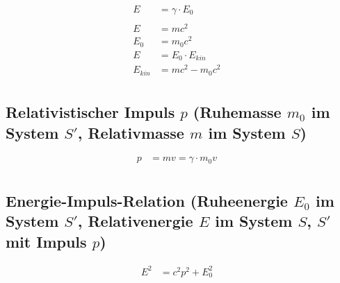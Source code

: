 \begin{align*}
  E &= \gamma \cdot E_0 &\\ &\\
  E &= m c^2 &\\
  E_0 &= m_0 c^2 &\\
  E &= E_0 \cdot E_{kin} &\\
  E_{kin} &= m c^2 - m_0 c^2 &\\
\end{align*}

\subsection{Relativistischer Impuls $p$ (Ruhemasse $m_0$ im System $S'$, Relativmasse $m$ im System
$S$)}

\begin{align*}
  p &= m v = \gamma \cdot m_0 v &\\
\end{align*}

\subsection{Energie-Impuls-Relation (Ruheenergie $E_0$ im System $S'$, Relativenergie $E$ im System
$S$, $S'$ mit Impuls $p$)}

\begin{align*}
  E^2 &= c^2 p^2 + E^2_0 &\\
\end{align*}
